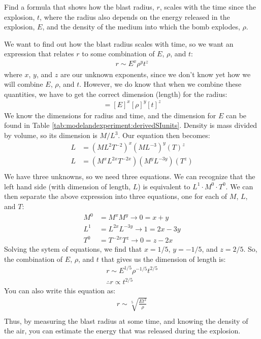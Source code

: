 \begin{example}
{Find a formula that shows how the blast radius, $r$, scales with the time since the explosion, $t$, where the radius also depends on the energy released in the explosion, $E$, and the density of the medium into which the bomb explodes, $\rho$.} 

We want to find out how the blast radius scales with time, so we want an expression that relates $r$ to some combination of $E$, $\rho$, and $t$:
\begin{align*}
r \sim E^x\rho^y t^z
\end{align*} 
where $x$, $y$, and $z$ are our unknown exponents, since we don't know yet how we will combine $E$, $\rho$, and $t$. However, we do know that when we combine these quantities, we have to get the correct dimension (length) for the radius:
\begin{align*}
[r]=[E]^x[\rho]^y[t]^z
\end{align*}
We know the dimensions for radius and time, and the dimension for $E$ can be found in Table \ref{tab:modelandexperiment:derivedSIunits}. Density is mass divided by volume, so its dimension is $M/L^3$. Our equation then becomes:
\begin{align*}
L&=(ML^2T^{-2})^x(ML^{-3})^y(T)^z\\
L&=(M^xL^{2x}T^{-2x})(M^yL^{-3y})(T^z)\\
\end{align*}
We have three unknowns, so we need three equations. We can recognize that the left hand side (with dimension of length, $L$) is equivalent to $L^1\cdot M^0\cdot T^0$. We can then separate the above expression into three equations, one for each of $M$, $L$, and $T$: 
\begin{align*}
M^0&=M^xM^y \rightarrow 0 = x+y\\
L^1&=L^{2x}L^{-3y} \rightarrow 1=2x-3y\\
T^0&=T^{-2x}T^{z} \rightarrow 0=z-2x
\end{align*}
Solving the sytem of equations, we find that $x=1/5$, $y=-1/5$, and $z=2/5$. 
So, the combination of $E$, $\rho$, and $t$ that gives us the dimension of length is:
\begin{align*}
r\sim E^{1/5}\rho^{-1/5}t^{2/5}\\
\therefore r\propto t^{2/5}
\end{align*}
You can also write this equation as:
\begin{align*}
r\sim \sqrt[5]{\frac{Et^2}{\rho}}\\
\end{align*}
Thus, by measuring the blast radius at some time, and knowing the density of the air, you can estimate the energy that was released during the explosion.
\end{example}

